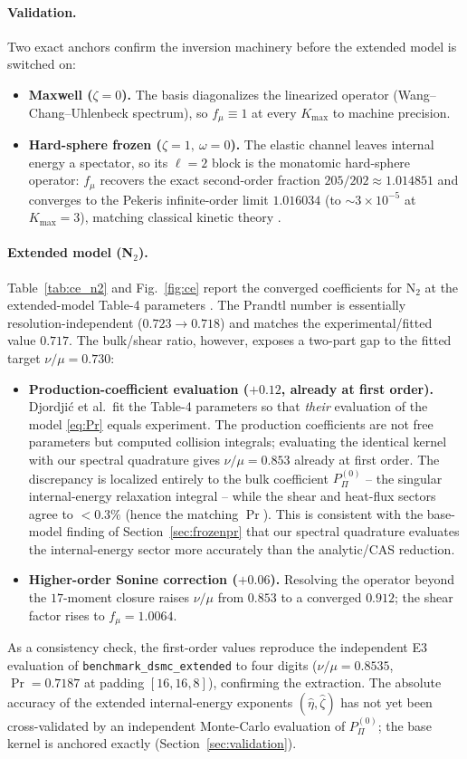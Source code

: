 \paragraph{Validation.}
Two exact anchors confirm the inversion machinery before the extended model is switched on:
\begin{itemize}
\item \textbf{Maxwell ($\zeta=0$).} The basis diagonalizes the linearized operator (Wang--Chang--Uhlenbeck
spectrum), so $f_\mu\equiv1$ at every $K_{\max}$ to machine precision.
\item \textbf{Hard-sphere frozen ($\zeta=1,\ \omega=0$).} The elastic channel leaves internal energy a
spectator, so its $\ell=2$ block is the monatomic hard-sphere operator: $f_\mu$ recovers the exact
second-order fraction $205/202\approx1.014851$ and converges to the Pekeris infinite-order limit
$1.016034$ (to $\sim3\times10^{-5}$ at $K_{\max}=3$), matching classical kinetic theory
\cite{chapman:1970}.
\end{itemize}

\paragraph{Extended model (N$_2$).}
Table~\ref{tab:ce_n2} and Fig.~\ref{fig:ce} report the converged coefficients for N$_2$ at the extended-model
Table-4 parameters \cite[eq.~(43)]{Djordjic2023}. The Prandtl number is essentially resolution-independent
($0.723\!\to\!0.718$) and matches the experimental/fitted value $0.717$. The bulk/shear ratio, however,
exposes a two-part gap to the fitted target $\nu/\mu=0.730$:
\begin{itemize}
\item \textbf{Production-coefficient evaluation ($+0.12$, already at first order).} Djordji\'c et al.\ fit
the Table-4 parameters so that \emph{their} evaluation of the model \eqref{eq:Pr} equals experiment. The
production coefficients are not free parameters but computed collision integrals; evaluating the identical
kernel with our spectral quadrature gives $\nu/\mu=0.853$ already at first order. The discrepancy is
localized entirely to the bulk coefficient $P_\Pi^{(0)}$ -- the singular internal-energy relaxation
integral -- while the shear and heat-flux sectors agree to $<0.3\%$ (hence the matching $\Pr$). This is
consistent with the base-model finding of Section~\ref{sec:frozenpr} that our spectral quadrature evaluates
the internal-energy sector more accurately than the analytic/CAS reduction.
\item \textbf{Higher-order Sonine correction ($+0.06$).} Resolving the operator beyond the $17$-moment
closure raises $\nu/\mu$ from $0.853$ to a converged $0.912$; the shear factor rises to $f_\mu=1.0064$.
\end{itemize}
As a consistency check, the first-order values reproduce the independent E3 evaluation of
\texttt{benchmark\_dsmc\_extended} to four digits ($\nu/\mu=0.8535$, $\Pr=0.7187$ at padding $[16,16,8]$),
confirming the extraction. The absolute accuracy of the extended internal-energy exponents
$(\hat\eta,\hat\zeta)$ has not yet been cross-validated by an independent Monte-Carlo evaluation of
$P_\Pi^{(0)}$; the base kernel is anchored exactly (Section~\ref{sec:validation}).

